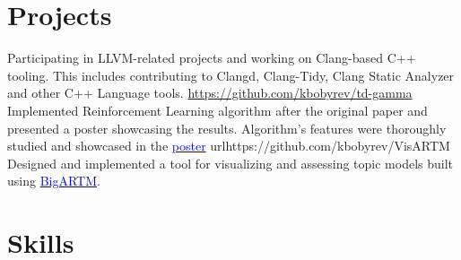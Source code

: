 \documentclass[10pt,a4paper,sans]{moderncv}
\begin{document}

\section{Projects}
    {Participating in LLVM-related projects and working on Clang-based C++
     tooling. This includes contributing to Clangd, Clang-Tidy, Clang Static
     Analyzer and other C++ Language tools.}
    {\url{https://github.com/kbobyrev/td-gamma}}{}
    {Implemented Reinforcement Learning algorithm after the original paper and
     presented a poster showcasing the results. Algorithm's features were
     thoroughly studied and showcased in the
     \href{https://kbobyrev.github.io/resources/TD-Gamma-Poster.pdf}{\textcolor{blue}{poster}}}
    {url{https://github.com/kbobyrev/VisARTM}}{}
    {Designed and implemented a tool for visualizing and assessing topic models
     built using
     \href{https://github.com/bigartm/bigartm}{\textcolor{blue}{BigARTM}}.}

\section{Skills}

\nocite{*}


\end{document}

